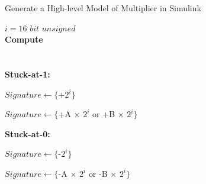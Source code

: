 \begin{algorithm}
\caption{Generate a High-level Model of  Multiplier in Simulink}
\begin{algorithmic}
\label{algo-mull}
\REQUIRE $ i = 16$  $bit$ $unsigned$ \\
\textbf{Compute}\\ 
\hspace{1.5cm}{$Original =  A $ $ \times $ $ B$ } \\
\hspace{1.5cm}{$Faulty =  A $ $ \times $ $ B$ } \\
\vspace{0.20 cm }
\textbf{Stuck-at-1:}
\vspace{0.20 cm }

\vspace{0.10 cm }
\STATE $Signature \leftarrow  \{$+$ 2^{i}\}$
\vspace{0.10 cm }
\vspace{0.20 cm }


\vspace{0.10 cm }
\STATE $Signature \leftarrow  \{$+$  $A$ $ $ \times $ $2^{i} $ $ $or$ $ $ $+$ $B$ $ $ \times $ $2^{i}\}$


\vspace{0.10 cm }
\ENDIF
\vspace{0.20 cm }

\vspace{0.20 cm }
\textbf{Stuck-at-0:}
\vspace{0.20 cm }

\vspace{0.10 cm }
\STATE $Signature \leftarrow  \{$-$ 2^{i}\}$
\vspace{0.10 cm }
\vspace{0.20 cm }


\vspace{0.10 cm }
\STATE $Signature \leftarrow  \{$-$  $A$ $ $ \times $ $2^{i} $ $ $or$ $ $ $-$  $B$ $ $ \times $ $2^{i}\}$

\vspace{0.10 cm }
\ENDIF
\vspace{0.20 cm }

\end{algorithmic}
\end{algorithm}






